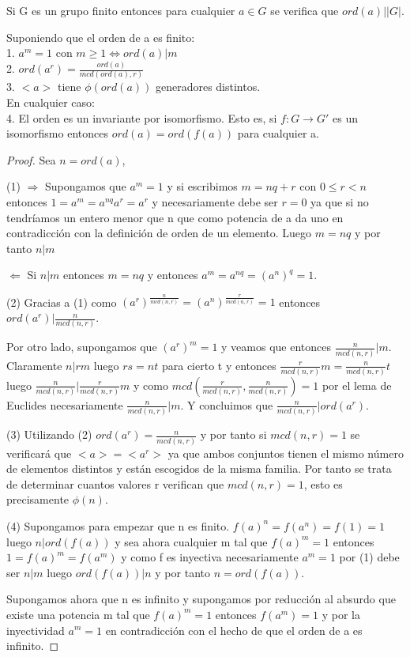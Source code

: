 \begin{corollary}
Si G es un grupo finito entonces para cualquier $a \in G$ se verifica que $ord(a) | |G|$.
\end{corollary}

\begin{proposition}
Suponiendo que el orden de a es finito: \\
1. $a^m = 1$ con $m \ge 1 \iff ord(a) | m$ \\
2. $ord(a^r) = \frac{ord(a)}{mcd(ord(a),r)}$ \\
3. $<a>$ tiene $\phi(ord(a))$ generadores distintos. \\
En cualquier caso: \\
4. El orden es un invariante por isomorfismo. Esto es, si $f:G \rightarrow G'$ es un isomorfismo entonces $ord(a) = ord(f(a))$ para cualquier a.
\end{proposition}
\begin{proof}
Sea $n = ord(a)$,

(1) $\Rightarrow$ Supongamos que $a^m = 1$ y si escribimos $m = nq + r$ con $0 \le r < n$ entonces $1=a^m = a^{nq}a^r = a^r$ y necesariamente debe ser $r = 0$ ya que si no tendríamos un entero menor que n que como potencia de a da uno en contradicción con la definición de orden de un elemento. Luego $m = nq$ y por tanto $n | m$

$\Leftarrow$ Si $n|m$ entonces $m = nq$ y entonces $a^m = a^{nq} = (a^n)^q = 1$.

(2) Gracias a (1) como $(a^r)^{\frac{n}{mcd(n,r)}} = (a^n)^{\frac{r}{mcd(n,r)}} = 1$ entonces $ord(a^r) | \frac{n}{mcd(n,r)}$. 

Por otro lado, supongamos que $(a^r)^m = 1$ y veamos que entonces $\frac{n}{mcd(n,r)} | m$. Claramente $n | rm$ luego $rs = nt$ para cierto t y entonces $\frac{r}{mcd(n,r)}m = \frac{n}{mcd(n,r)}t$ luego $\frac{n}{mcd(n,r)} | \frac{r}{mcd(n,r)}m$ y como $mcd\left(\frac{r}{mcd(n,r)},\frac{n}{mcd(n,r)}\right) = 1$ por el lema de Euclides necesariamente $\frac{n}{mcd(n,r)} | m$. Y concluimos que $\frac{n}{mcd(n,r)} | ord(a^r)$.

(3) Utilizando (2) $ord(a^r) = \frac{n}{mcd(n,r)}$ y por tanto si $mcd(n,r) = 1$  se verificará que $<a> = <a^r>$ ya que ambos conjuntos tienen el mismo número de elementos distintos y están escogidos de la misma familia. Por tanto se trata de determinar cuantos valores r verifican que $mcd(n,r) = 1$, esto es precisamente $\phi(n)$.

(4) Supongamos para empezar que n es finito. $f(a)^n=f(a^n)=f(1)=1$ luego $n |ord(f(a))$ y sea ahora cualquier m tal que $f(a)^m = 1$ entonces $1 = f(a)^m = f(a^m)$ y como f es inyectiva necesariamente $a^m = 1$ por (1) debe ser $n | m$ luego $ord(f(a)) | n$ y por tanto $n = ord(f(a))$.

Supongamos ahora que n es infinito y supongamos por reducción al absurdo que existe una potencia m tal que $f(a)^m = 1$ entonces $f(a^m) = 1$ y por la inyectividad $a^m = 1$ en contradicción con el hecho de que el orden de a es infinito.
\end{proof}

